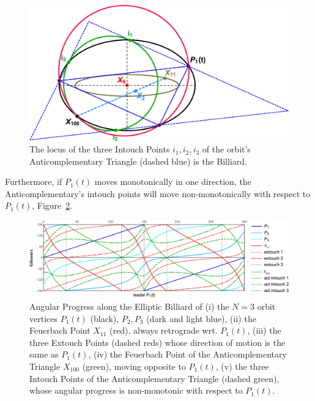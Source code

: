 \begin{figure}[H]
    \centering
    \includegraphics[width=\textwidth]{pics/0048_act_intouch.pdf}
    \caption{The locus of the three Intouch Points $i_1,i_2,i_3$ of the orbit's Anticomplementary Triangle (dashed blue) is the Billiard.}
    \label{fig:act_intouch}
\end{figure}

Furthermore, if $P_1(t)$ moves monotonically in one direction, the Anticomplementary's intouch points will move non-monotonically with respect to $P_1(t)$, Figure~\ref{fig:act-progress}. 

\begin{figure}[H]
    \centering
    \includegraphics[width=\textwidth]{pics/0049_act_progress.pdf}
    \caption{Angular Progress along the Elliptic Billiard of (i) the $N=3$ orbit vertices $P_1(t)$ (black), $P_2,P_3$ (dark and light blue), (ii) the Feuerbach Point $X_{11}$ (red), always retrograde wrt. $P_1(t)$, (iii) the three Extouch Points (dashed reds) whose direction of motion is the same as $P_1(t)$, (iv) the Feuerbach Point of the Anticomplementary Triangle $X_{100}$ (green), moving opposite to $P_1(t)$, (v) the three Intouch Points of the Anticomplementary Triangle (dashed green), whose angular progress is non-monotonic with respect to $P_1(t)$.}
    \label{fig:act-progress}
\end{figure}
